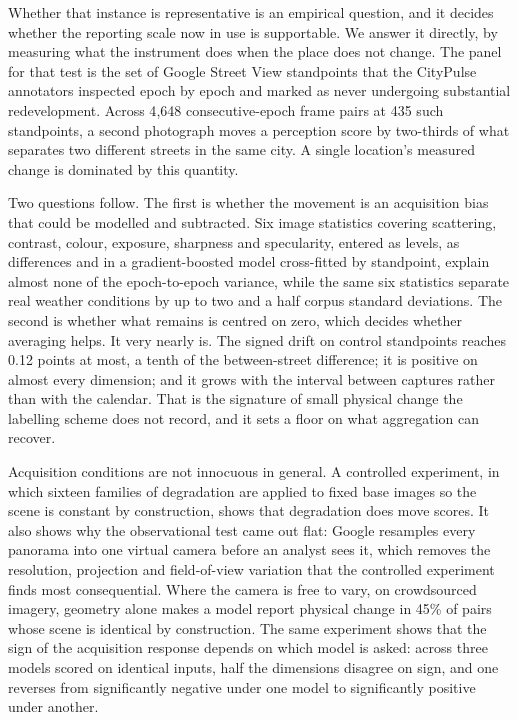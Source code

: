 Whether that instance is representative is an empirical question, and it decides
whether the reporting scale now in use is supportable. We answer it directly, by
measuring what the instrument does when the place does not change. The panel for
that test is the set of Google Street View standpoints that the CityPulse
annotators \citep{huang2024citypulse} inspected epoch by epoch and marked as
never undergoing substantial redevelopment. Across 4{,}648 consecutive-epoch
frame pairs at 435 such standpoints, a second photograph moves a perception
score by two-thirds of what separates two different streets in the same city. A
single location's measured change is dominated by this quantity.

Two questions follow. The first is whether the movement is an acquisition bias
that could be modelled and subtracted. Six image statistics covering scattering,
contrast, colour, exposure, sharpness and specularity, entered as levels, as
differences and in a gradient-boosted model cross-fitted by standpoint, explain
almost none of the epoch-to-epoch variance, while the same six statistics
separate real weather conditions by up to two and a half corpus standard
deviations. The second is whether what remains is centred on zero, which decides
whether averaging helps. It very nearly is. The signed drift on control
standpoints reaches 0.12 points at most, a tenth of the between-street
difference; it is positive on almost every dimension; and it grows with the
interval between captures rather than with the calendar. That is the signature
of small physical change the labelling scheme does not record, and it sets a
floor on what aggregation can recover.

Acquisition conditions are not innocuous in general. A controlled experiment, in
which sixteen families of degradation are applied to fixed base images so the
scene is constant by construction, shows that degradation does move scores. It
also shows why the observational test came out flat: Google resamples every
panorama into one virtual camera before an analyst sees it, which removes the
resolution, projection and field-of-view variation that the controlled
experiment finds most consequential. Where the camera is free to vary, on
crowdsourced imagery, geometry alone makes a model report physical change in
45\% of pairs whose scene is identical by construction. The same experiment
shows that the sign of the acquisition response depends on which model is asked:
across three models scored on identical inputs, half the dimensions disagree on
sign, and one reverses from significantly negative under one model to
significantly positive under another.


